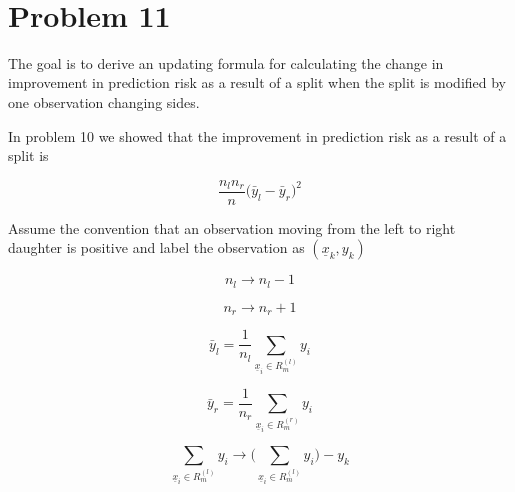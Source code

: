 \documentclass[11pt]{article}
\begin{document}
\begin{center}

\ \\
\end{center}
\section*{Problem 11}
\setlength{\parindent}{0pt}

The goal is to derive an updating formula for calculating the change in improvement  in prediction risk as a result of a split when the split is modified by one observation changing sides. 

In problem 10 we showed that the improvement in prediction risk as a result of a split is 

$$ \frac{n_ln_r}{n}\big(\bar{y}_l - \bar{y}_r\big)^2$$

Assume the convention that an observation moving from the left to right daughter is positive and label the observation as $(\underline{x}_k, y_k)$

\begin{equation}
n_l \rightarrow n_l - 1
\end{equation}

\begin{equation}
n_r \rightarrow n_r + 1
\end{equation}

\begin{equation}
\bar{y}_l = \frac{1}{n_l}\sum_{\underline{x}_i \in R_m^{(l)}}y_i
\end{equation}

\begin{equation}
\bar{y}_r = \frac{1}{n_r}\sum_{\underline{x}_i \in R_m^{(r)}}y_i
\end{equation}

\begin{equation}
\sum_{ \underline{x}_i \in R_m^{(l)}} y_i \rightarrow \bigg( \sum_{ \underline{x}_i \in R_m^{(l)}}y_i \bigg) - y_k
\end{equation}
\end{document}
